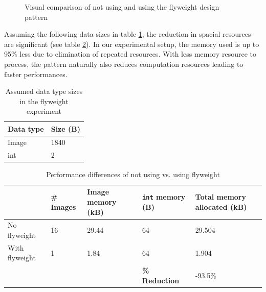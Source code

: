 \begin{multicols}{2}
\begin{figure}[H]
	\caption{Visual comparison of not using and using the flyweight design pattern}
	\label{fig:flyweight}
\end{figure}

Assuming the following data sizes in table \ref{table:flyweight-datasize}, the reduction in spacial resources are significant (see table \ref{table:flyweight-optimization}). In our experimental setup, the memory used is up to 95\% less due to elimination of repeated resources. With less memory resource to process, the pattern naturally also reduces computation resources leading to faster performances.

\begin{table}[H]
    \centering
    \begin{tabular}{ll}
    Data type & Size (B) \\ \hline
    Image     & 1840     \\
    int       & 2       
    \end{tabular}
    \caption{Assumed data type sizes in the flyweight experiment}
    \label{table:flyweight-datasize}
\end{table}

\iftwocolumns
\end{multicols}
\fi
\begin{table}[H]
    \centering
    \begin{tabular}{lllll}
    & \# Images & Image memory (kB) & \texttt{int} memory (B) & Total memory allocated (kB)\\ \hline
    No flyweight & 16 & 29.44 & 64 & 29.504 \\
    With flyweight & 1 & 1.84 & 64 & 1.904 \\ \hline
    & & & \textbf{\% Reduction} & -93.5\% \\
    \end{tabular}
    \caption{Performance differences of not using vs. using flyweight}
    \label{table:flyweight-optimization}
\end{table}
\iftwocolumns
\begin{multicols}{2}
\fi



\iftwocolumns
\end{multicols}
\fi